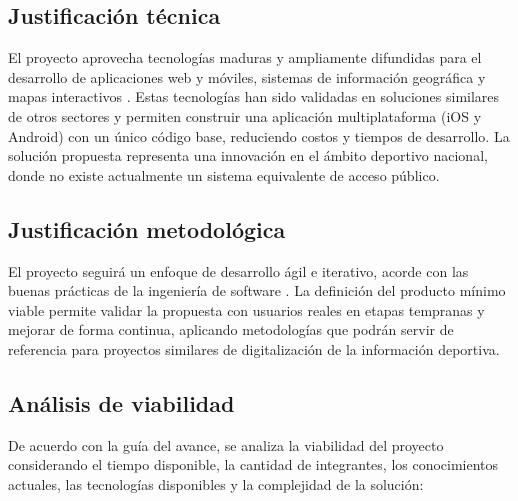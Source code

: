 \subsection{Justificaci\'on t\'ecnica}

El proyecto aprovecha tecnolog\'ias maduras y ampliamente difundidas para el
desarrollo de aplicaciones web y m\'oviles, sistemas de informaci\'on geogr\'afica
y mapas interactivos \citep{longley2015, pressman2010}. Estas tecnolog\'ias han
sido validadas en soluciones similares de otros sectores y permiten construir
una aplicaci\'on multiplataforma (iOS y Android) con un \'unico c\'odigo base,
reduciendo costos y tiempos de desarrollo. La soluci\'on propuesta representa
una innovaci\'on en el \'ambito deportivo nacional, donde no existe actualmente un
sistema equivalente de acceso p\'ublico.

\subsection{Justificaci\'on metodol\'ogica}

El proyecto seguir\'a un enfoque de desarrollo \'agil e iterativo, acorde con las
buenas pr\'acticas de la ingenier\'ia de software \citep{sommerville2011,
larman2004}. La definici\'on del producto m\'inimo viable permite validar la
propuesta con usuarios reales en etapas tempranas y mejorar de forma
continua, aplicando metodolog\'ias que podr\'an servir de referencia para
proyectos similares de digitalizaci\'on de la informaci\'on deportiva.

\subsection{An\'alisis de viabilidad}

De acuerdo con la gu\'ia del avance, se analiza la viabilidad del proyecto
considerando el tiempo disponible, la cantidad de integrantes, los
conocimientos actuales, las tecnolog\'ias disponibles y la complejidad de la
soluci\'on:

